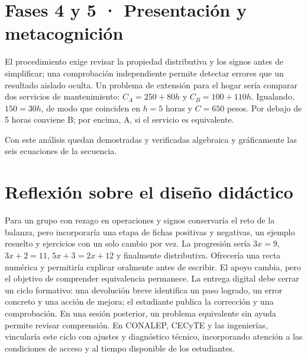 \documentclass[spanish,letterpaper,oneside]{article}
\begin{document}
\section{Fases 4 y 5 · Presentación y metacognición}
El procedimiento exige revisar la propiedad distributiva y los signos antes de simplificar; una comprobación independiente permite detectar errores que un resultado aislado oculta. Un problema de extensión para el hogar sería comparar dos servicios de mantenimiento: $C_A=250+80h$ y $C_B=100+110h$. Igualando, $150=30h$, de modo que coinciden en $h=5$ horas y $C=650$ pesos. Por debajo de 5 horas conviene B; por encima, A, si el servicio es equivalente.
\begin{center}
\end{center}
Con este análisis quedan demostradas y verificadas algebraica y gráficamente las seis ecuaciones de la secuencia.
\section{Reflexión sobre el diseño didáctico}
Para un grupo con rezago en operaciones y signos conservaría el reto de la balanza, pero incorporaría una etapa de fichas positivas y negativas, un ejemplo resuelto y ejercicios con un solo cambio por vez. La progresión sería $3x=9$, $3x+2=11$, $5x+3=2x+12$ y finalmente distributiva. Ofrecería una recta numérica y permitiría explicar oralmente antes de escribir. El apoyo cambia, pero el objetivo de comprender equivalencia permanece.
La entrega digital debe cerrar un ciclo formativo: una devolución breve identifica un paso logrado, un error concreto y una acción de mejora; el estudiante publica la corrección y una comprobación. En una sesión posterior, un problema equivalente sin ayuda permite revisar comprensión. En CONALEP, CECyTE y las ingenierías, vincularía este ciclo con ajustes y diagnóstico técnico, incorporando atención a las condiciones de acceso y al tiempo disponible de los estudiantes.
\end{document}
